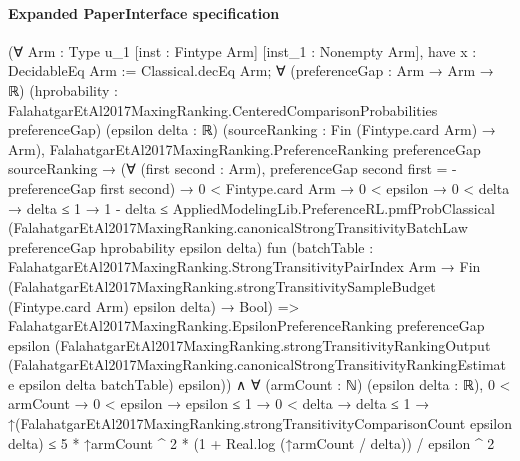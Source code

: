 \documentclass[10pt]{article}
\begin{document}
\paragraph{Expanded PaperInterface specification}
\begin{ReviewVerbatim}
(∀ {Arm : Type u_1} [inst : Fintype Arm] [inst_1 : Nonempty Arm],
    have x : DecidableEq Arm := Classical.decEq Arm;
    ∀ (preferenceGap : Arm → Arm → ℝ)
      (hprobability : FalahatgarEtAl2017MaxingRanking.CenteredComparisonProbabilities preferenceGap) (epsilon delta : ℝ)
      (sourceRanking : Fin (Fintype.card Arm) → Arm),
      FalahatgarEtAl2017MaxingRanking.PreferenceRanking preferenceGap sourceRanking →
        (∀ (first second : Arm), preferenceGap second first = -preferenceGap first second) →
          0 < Fintype.card Arm →
            0 < epsilon →
              0 < delta →
                delta ≤ 1 →
                  1 - delta ≤
                    AppliedModelingLib.PreferenceRL.pmfProbClassical
                      (FalahatgarEtAl2017MaxingRanking.canonicalStrongTransitivityBatchLaw preferenceGap hprobability
                        epsilon delta)
                      fun
                        (batchTable :
                          FalahatgarEtAl2017MaxingRanking.StrongTransitivityPairIndex Arm →
                            Fin
                                (FalahatgarEtAl2017MaxingRanking.strongTransitivitySampleBudget (Fintype.card Arm)
                                  epsilon delta) →
                              Bool) =>
                      FalahatgarEtAl2017MaxingRanking.EpsilonPreferenceRanking preferenceGap epsilon
                        (FalahatgarEtAl2017MaxingRanking.strongTransitivityRankingOutput
                          (FalahatgarEtAl2017MaxingRanking.canonicalStrongTransitivityRankingEstimate epsilon delta
                            batchTable)
                          epsilon)) ∧
  ∀ (armCount : ℕ) (epsilon delta : ℝ),
    0 < armCount →
      0 < epsilon →
        epsilon ≤ 1 →
          0 < delta →
            delta ≤ 1 →
              ↑(FalahatgarEtAl2017MaxingRanking.strongTransitivityComparisonCount epsilon delta) ≤
                5 * ↑armCount ^ 2 * (1 + Real.log (↑armCount / delta)) / epsilon ^ 2
\end{ReviewVerbatim}
\end{document}
